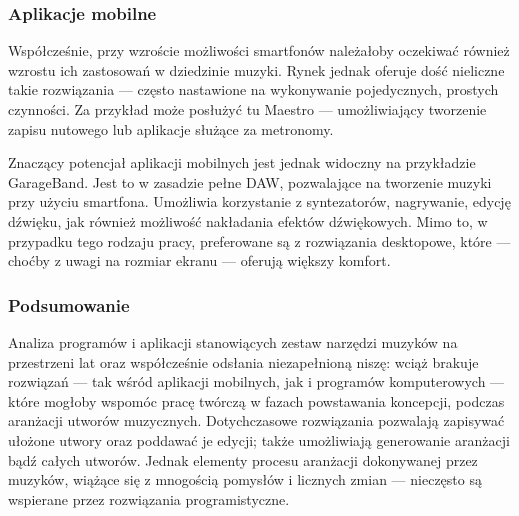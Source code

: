 \subsubsection{Aplikacje mobilne}
Współcześnie, przy wzroście możliwości smartfonów należałoby oczekiwać również wzrostu ich zastosowań w dziedzinie
muzyki. Rynek jednak oferuje dość nieliczne takie rozwiązania — często nastawione na wykonywanie pojedycznych,
prostych czynności. Za przykład może posłużyć tu Maestro — umożliwiający tworzenie zapisu nutowego lub aplikacje
służące za metronomy.

Znaczący potencjał aplikacji mobilnych jest jednak widoczny na przykładzie GarageBand. Jest to w zasadzie pełne DAW,
pozwalające na tworzenie muzyki przy użyciu smartfona. Umożliwia korzystanie z syntezatorów, nagrywanie, edycję dźwięku,
jak również możliwość nakładania efektów dźwiękowych. Mimo to, w przypadku tego rodzaju pracy, preferowane są
z rozwiązania desktopowe, które — choćby z uwagi na rozmiar ekranu — oferują większy komfort.

\subsubsection{Podsumowanie}
Analiza programów i aplikacji stanowiących zestaw narzędzi muzyków na przestrzeni lat oraz współcześnie
odsłania niezapełnioną niszę: wciąż brakuje rozwiązań — tak wśród aplikacji mobilnych, jak i programów komputerowych —
które mogłoby wspomóc pracę twórczą w fazach powstawania koncepcji, podczas aranżacji utworów muzycznych. Dotychczasowe
rozwiązania pozwalają zapisywać ułożone utwory oraz poddawać je edycji; także umożliwiają generowanie aranżacji bądź całych
utworów. Jednak elementy procesu aranżacji dokonywanej przez muzyków, wiążące się z mnogością pomysłów i licznych zmian —
nieczęsto są wspierane przez rozwiązania programistyczne.

